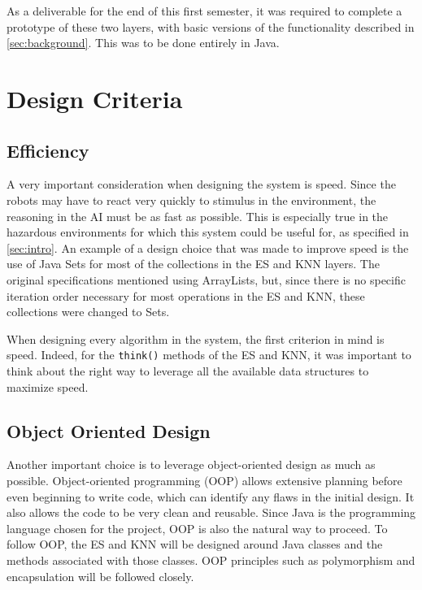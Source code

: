 \documentclass[titlepage,11pt]{article}
\newcommand{\code}[1]{\texttt{#1}}
\begin{document}
As a deliverable for the end of this first semester, it was required to complete a prototype of these two layers, with basic versions of the functionality described in \autoref{sec:background}. This was to be done entirely in Java.

\section{Design Criteria}

\subsection{Efficiency}

A very important consideration when designing the system is speed. Since the robots may have to react very quickly to stimulus in the environment, the reasoning in the AI must be as fast as possible. This is especially true in the hazardous environments for which this system could be useful for, as specified in \autoref{sec:intro}. An example of a design choice that was made to improve speed is the use of Java Sets for most of the collections in the ES and KNN layers. The original specifications mentioned using ArrayLists, but, since there is no specific iteration order necessary for most operations in the ES and KNN, these collections were changed to Sets.

When designing every algorithm in the system, the first criterion in mind is speed. Indeed, for the \code{think()} methods of the ES and KNN, it was important to think about the right way to leverage all the available data structures to maximize speed.

\subsection{Object Oriented Design}

Another important choice is to leverage object-oriented design as much as possible. Object-oriented programming (OOP) allows extensive planning before even beginning to write code, which can identify any flaws in the initial design. It also allows the code to be very clean and reusable. Since Java is the programming language chosen for the project, OOP is also the natural way to proceed. To follow OOP, the ES and KNN will be designed around Java classes and the methods associated with those classes. OOP principles such as polymorphism and encapsulation will be followed closely.
\end{document}
